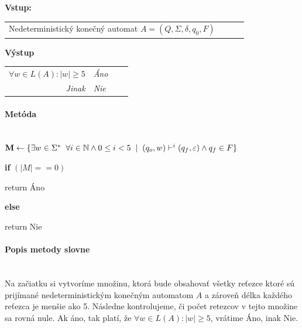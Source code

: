 \documentclass[11pt,a4paper]{article}
\begin{document}
\textbf{Vstup: }\\[-1.8em]
\begin{center}
\begin{minipage}{0.85\textwidth}
    \begin{tabular}{rlcl}
        Nedeterministický konečný automat $A = (Q, \Sigma, \delta, q_0 , F)$
    \end{tabular}
\end{minipage}
\end{center}


\textbf{Výstup}\\[-1.8em]
\begin{center}
\begin{minipage}{0.85\textwidth}
    \begin{tabular}{r|lcl}
        \textit{$\forall w \in L(A) : |w| \ge 5$ }  & \textit{Áno}\\
        \textit{Jinak}  & \textit{Nie}\\
    \end{tabular}
\end{minipage}
\end{center}

\paragraph{Metóda}\mbox{{}}\\

$\textbf{M} \gets \{ \exists w \in \Sigma^* \hspace{0.2cm} \forall i \in \mathbb{N} \land 0 \le i < 5 \hspace{0.2cm} | \hspace{0.2cm} (q_o, w) \vdash^i (q_f, \varepsilon) \land q_f \in F \}$

\textbf{if} $(|M| == 0)$

\hspace{0.55cm} return Áno

\textbf{else}

\hspace{0.55cm} return Nie


\paragraph{Popis metody slovne}\mbox{{}}\\
Na začiatku si vytvoríme množinu, ktorá bude obsahovať všetky reťezce ktoré sú prijímané nedeterministickým konečným automatom $A$ a zároveň délka každého reťezca je menšie ako 5.
Následne kontrolujeme, či počet retezcov v tejto množine sa rovná nule. Ak áno, tak platí, že $\forall w \in L(A) : |w| \ge 5$, vrátime Áno, inak Nie.
\end{document}
